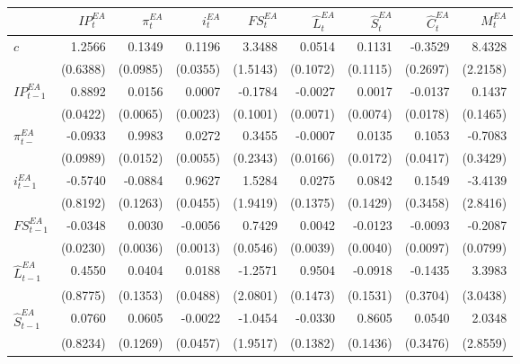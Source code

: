 \begin{sidewaystable}
    \centering
    \begin{tabular}{lrrrrrrrr}
        \toprule
        {} &        $IP^{EA}_{t}$ &   $\pi^{EA}_{t}$ &       $i^{EA}_{t}$ &       $FS^{EA}_{t}$ &         $\hat{L}^{EA}_{t}$ &         $\hat{S}^{EA}_{t}$ &         $\hat{C}^{EA}_{t}$ &   $M^{EA}_{t}$ \\
        \midrule
        $c$           &  1.2566 &   0.1349 &      0.1196 &  3.3488 &  0.0514 &  0.1131 & -0.3529 &    8.4328 \\
                &  (0.6388) &   (0.0985) &      (0.0355) &  (1.5143) &  (0.1072) &  (0.1115) &  (0.2697) &    (2.2158) \\
        $IP^{EA}_{t-1}$        &  0.8892 &   0.0156 &      0.0007 & -0.1784 & -0.0027 &  0.0017 & -0.0137 &    0.1437 \\
              &  (0.0422) &   (0.0065) &      (0.0023) &  (0.1001) &  (0.0071) &  (0.0074) &  (0.0178) &    (0.1465) \\
        $\pi^{EA}_{t-}$    & -0.0933 &   0.9983 &      0.0272 &  0.3455 & -0.0007 &  0.0135 &  0.1053 &   -0.7083 \\
            &  (0.0989) &   (0.0152) &      (0.0055) &  (0.2343) &  (0.0166) &  (0.0172) &  (0.0417) &    (0.3429) \\
        $i^{EA}_{t-1}$    & -0.5740 &  -0.0884 &      0.9627 &  1.5284 &  0.0275 &  0.0842 &  0.1549 &   -3.4139 \\
         &  (0.8192) &   (0.1263) &      (0.0455) &  (1.9419) &  (0.1375) &  (0.1429) &  (0.3458) &    (2.8416) \\
        $FS^{EA}_{t-1}$        & -0.0348 &   0.0030 &     -0.0056 &  0.7429 &  0.0042 & -0.0123 & -0.0093 &   -0.2087 \\
             &  (0.0230) &   (0.0036) &      (0.0013) &  (0.0546) &  (0.0039) &  (0.0040) &  (0.0097) &    (0.0799) \\
        $\hat{L}^{EA}_{t-1}$          &  0.4550 &   0.0404 &      0.0188 & -1.2571 &  0.9504 & -0.0918 & -0.1435 &    3.3983 \\
               &  (0.8775) &   (0.1353) &      (0.0488) &  (2.0801) &  (0.1473) &  (0.1531) &  (0.3704) &    (3.0438) \\
        $\hat{S}^{EA}_{t-1}$          &  0.0760 &   0.0605 &     -0.0022 & -1.0454 & -0.0330 &  0.8605 &  0.0540 &    2.0348 \\
               &  (0.8234) &   (0.1269) &      (0.0457) &  (1.9517) &  (0.1382) &  (0.1436) &  (0.3476) &    (2.8559) \\

\end{tabular}
\end{sidewaystable}
